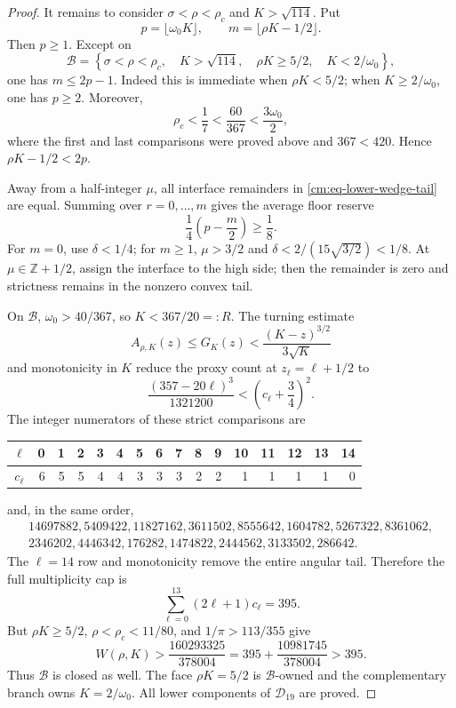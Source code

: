 \documentclass[11pt]{article}
\numberwithin{equation}{section}
\theoremstyle{definition}
\theoremstyle{remark}
\begin{document}
\begin{proof}
It remains to consider \(\sigma<\rho<\rho_c\) and
\(K>\sqrt{114}\).  Put
\[
 p=\lfloor\omega_0K\rfloor,\qquad
 m=\lfloor\rho K-1/2\rfloor.
\]
Then \(p\geq1\).  Except on
\begin{equation}
 \mathcal B=\left\{\sigma<\rho<\rho_c,\quad K>\sqrt{114},\quad
 \rho K\geq5/2,\quad K<2/\omega_0\right\},
 \label{cm:eq-exceptional-B}
\end{equation}
one has \(m\leq2p-1\).  Indeed this is immediate when \(\rho K<5/2\);
when \(K\geq2/\omega_0\), one has \(p\geq2\).  Moreover,
\[
 \rho_c<\frac17<\frac{60}{367}<\frac{3\omega_0}{2},
\]
where the first and last comparisons were proved above and
\(367<420\).  Hence \(\rho K-1/2<2p\).

Away from a half-integer \(\mu\), all interface remainders in
\eqref{cm:eq-lower-wedge-tail} are equal.  Summing over
\(r=0,\ldots,m\) gives the average floor reserve
\[
 \frac14\left(p-\frac m2\right)\geq\frac18.
\]
For \(m=0\), use \(\delta<1/4\); for \(m\geq1\), \(\mu>3/2\) and
\(\delta<2/(15\sqrt{3/2})<1/8\).  At
\(\mu\in\mathbb Z+1/2\), assign the interface to the high side; then the
remainder is zero and strictness remains in the nonzero convex tail.

On \(\mathcal B\), \(\omega_0>40/367\), so \(K<367/20=:R\).  The
turning estimate
\[
 A_{\rho,K}(z)\leq G_K(z)<\frac{(K-z)^{3/2}}{3\sqrt K}
\]
and monotonicity in \(K\) reduce the proxy count at
\(z_\ell=\ell+1/2\) to
\[
 \frac{(357-20\ell)^3}{1321200}
 <\left(c_\ell+\frac34\right)^2.
\]
The integer numerators of these strict comparisons are
\begin{center}
\small
\begin{tabular}{c|rrrrrrrrrrrrrrr}
\(\ell\)&0&1&2&3&4&5&6&7&8&9&10&11&12&13&14\\ \hline
\(c_\ell\)&6&5&5&4&4&3&3&3&2&2&1&1&1&1&0
\end{tabular}
\end{center}
and, in the same order,
\[
\begin{gathered}
14697882,5409422,11827162,3611502,8555642,
1604782,5267322,8361062,\\
2346202,4446342,176282,1474822,2444562,3133502,286642.
\end{gathered}
\]
The \(\ell=14\) row and monotonicity remove the entire angular tail.
Therefore the full multiplicity cap is
\[
 \sum_{\ell=0}^{13}(2\ell+1)c_\ell=395.
\]
But \(\rho K\geq5/2\), \(\rho<\rho_c<11/80\), and
\(1/\pi>113/355\) give
\[
 W(\rho,K)>
 \frac{160293325}{378004}
 =395+\frac{10981745}{378004}>395.
\]
Thus \(\mathcal B\) is closed as well.  The face \(\rho K=5/2\) is
\(\mathcal B\)-owned and the complementary branch owns
\(K=2/\omega_0\).  All lower
components of \(\mathcal D_{19}\) are proved.
\end{proof}
\end{document}
